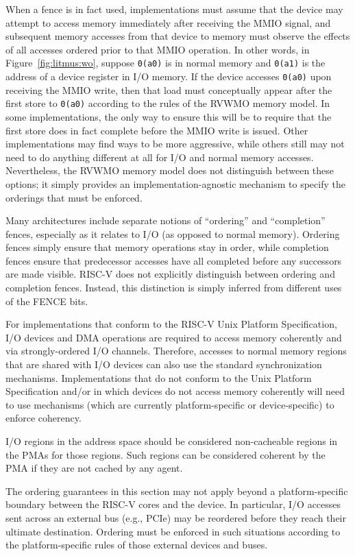 When a fence is in fact used, implementations must assume that the device may attempt to access memory immediately after receiving the MMIO signal, and subsequent memory accesses from that device to memory must observe the effects of all accesses ordered prior to that MMIO operation.
In other words, in Figure~\ref{fig:litmus:wo}, suppose {\tt 0(a0)} is in normal memory and {\tt 0(a1)} is the address of a device register in I/O memory.
If the device accesses {\tt 0(a0)} upon receiving the MMIO write, then that load must conceptually appear after the first store to {\tt 0(a0)} according to the rules of the RVWMO memory model.
In some implementations, the only way to ensure this will be to require that the first store does in fact complete before the MMIO write is issued.
Other implementations may find ways to be more aggressive, while others still may not need to do anything different at all for I/O and normal memory accesses.
Nevertheless, the RVWMO memory model does not distinguish between these options; it simply provides an implementation-agnostic mechanism to specify the orderings that must be enforced.

Many architectures include separate notions of ``ordering'' and ``completion'' fences, especially as it relates to I/O (as opposed to normal memory).
Ordering fences simply ensure that memory operations stay in order, while completion fences ensure that predecessor accesses have all completed before any successors are made visible.
RISC-V does not explicitly distinguish between ordering and completion fences.
Instead, this distinction is simply inferred from different uses of the FENCE bits.

For implementations that conform to the RISC-V Unix Platform Specification, I/O devices and DMA operations are required to access memory coherently and via strongly-ordered I/O channels.
Therefore, accesses to normal memory regions that are shared with I/O devices can also use the standard synchronization mechanisms.
Implementations that do not conform to the Unix Platform Specification and/or in which devices do not access memory coherently will need to use mechanisms (which are currently platform-specific or device-specific) to enforce coherency.

I/O regions in the address space should be considered non-cacheable regions in the PMAs for those regions.  Such regions can be considered coherent by the PMA if they are not cached by any agent.

The ordering guarantees in this section may not apply beyond a platform-specific boundary between the RISC-V cores and the device.  In particular, I/O accesses sent across an external bus (e.g., PCIe) may be reordered before they reach their ultimate destination.  Ordering must be enforced in such situations according to the platform-specific rules of those external devices and buses.

